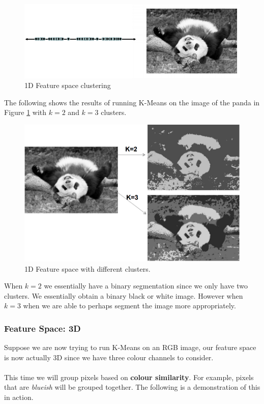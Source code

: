 \documentclass{article}
\begin{document}
\begin{figure}[htp]
    \centering
    \includegraphics[width=12cm]{slide_20_1}
    \caption{1D Feature space clustering}
    \label{fig:Slide20_1}
\end{figure}

The following shows the results of running K-Means on the image of the panda in Figure \ref{fig:Slide20_1} with $k = 2$ and $k = 3$ clusters. 

\newpage

\begin{figure}[htp]
    \centering
    \includegraphics[width=12cm]{slide_21_1}
    \caption{1D Feature space with different clusters.}
    \label{fig:Slide21_1}
\end{figure}

When $k = 2$ we essentially have a binary segmentation since we only have two clusters. We essentially obtain a binary black or white image. However when $k = 3$ when we are able to perhaps segment the image more appropriately.

\subsubsection{Feature Space: 3D}
Suppose we are now trying to run K-Means on an RGB image, our feature space is now actually 3D since we have three colour channels to consider.
\\\\
This time we will group pixels based on \textbf{colour similarity}. For example, pixels that are \textit{blueish} will be grouped together. The following is a demonstration of this in action.
\end{document}

